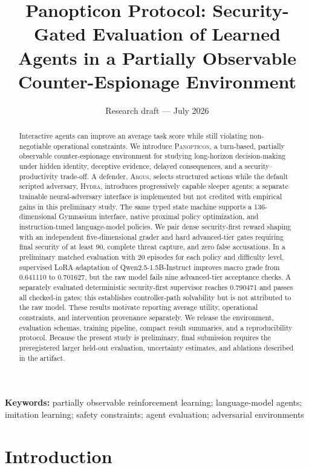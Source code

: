 \documentclass[11pt]{article}
\title{Panopticon Protocol: Security-Gated Evaluation of Learned Agents in a Partially Observable Counter-Espionage Environment}
\date{Research draft --- July 2026}
\newcommand{\system}{\textsc{Panopticon}}
\newcommand{\argus}{\textsc{Argus}}
\newcommand{\hydra}{\textsc{Hydra}}
\begin{document}
\maketitle

\begin{abstract}
Interactive agents can improve an average task score while still violating non-negotiable operational constraints. We introduce \system, a turn-based, partially observable counter-espionage environment for studying long-horizon decision-making under hidden identity, deceptive evidence, delayed consequences, and a security--productivity trade-off. A defender, \argus, selects structured actions while the default scripted adversary, \hydra, introduces progressively capable sleeper agents; a separate trainable neural-adversary interface is implemented but not credited with empirical gains in this preliminary study. The same typed state machine supports a 136-dimensional Gymnasium interface, native proximal policy optimization, and instruction-tuned language-model policies. We pair dense security-first reward shaping with an independent five-dimensional grader and hard advanced-tier gates requiring final security of at least 90, complete threat capture, and zero false accusations. In a preliminary matched evaluation with 20 episodes for each policy and difficulty level, supervised LoRA adaptation of Qwen2.5-1.5B-Instruct improves macro grade from 0.641110 to 0.701627, but the raw model fails nine advanced-tier acceptance checks. A separately evaluated deterministic security-first supervisor reaches 0.790471 and passes all checked-in gates; this establishes controller-path solvability but is not attributed to the raw model. These results motivate reporting average utility, operational constraints, and intervention provenance separately. We release the environment, evaluation schemas, training pipeline, compact result summaries, and a reproducibility protocol. Because the present study is preliminary, final submission requires the preregistered larger held-out evaluation, uncertainty estimates, and ablations described in the artifact.
\end{abstract}

\noindent\textbf{Keywords:} partially observable reinforcement learning; language-model agents; imitation learning; safety constraints; agent evaluation; adversarial environments

\section{Introduction}
\end{document}
